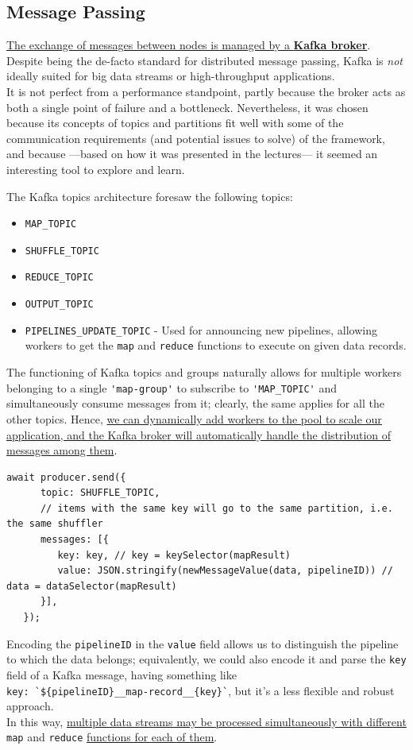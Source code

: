 \subsection{Message Passing}
\ul{The exchange of messages between nodes is managed by a \textbf{Kafka broker}}. 
Despite being the de-facto standard for distributed message passing, Kafka is \textit{not} ideally suited for big data streams or high-throughput applications.\\
It is not perfect from a performance standpoint, partly because the broker acts as both a single point of failure and a bottleneck. Nevertheless, it was chosen because its concepts of topics and partitions fit well with some of the communication requirements (and potential issues to solve) of the framework, and because ---based on how it was presented in the lectures--- it seemed an interesting tool to explore and learn.

{The Kafka topics architecture foresaw the following topics:\ns
\begin{itemize}
   \label{enum:simplerTopics}
   \item \verb|MAP_TOPIC|
   \item \verb|SHUFFLE_TOPIC|
   \item \verb|REDUCE_TOPIC|
   \item \verb|OUTPUT_TOPIC|
   \item \verb|PIPELINES_UPDATE_TOPIC| - Used for announcing new pipelines, allowing workers to get the \verb|map| and \verb|reduce| functions to execute on given data records.
\end{itemize}}

The functioning of Kafka topics and groups naturally allows for multiple workers belonging to a single \verb|'map-group'| to subscribe to \verb|'MAP_TOPIC'| and simultaneously consume messages from it; clearly, the same applies for all the other topics. 
Hence, \ul{we can dynamically add workers to the pool to scale our application, and the Kafka broker will automatically handle the distribution of messages among them}.

\begin{lstlisting}[caption={Sending MAP record to shuffle topic},label={lst:sendingMapRecord}]
   await producer.send({
      topic: SHUFFLE_TOPIC,
      // items with the same key will go to the same partition, i.e. the same shuffler
      messages: [{ 
         key: key, // key = keySelector(mapResult)
         value: JSON.stringify(newMessageValue(data, pipelineID)) // data = dataSelector(mapResult)
      }],
   });
\end{lstlisting}
Encoding the \verb|pipelineID| in the \verb|value| field allows us to distinguish the pipeline to which the data belongs; equivalently, we could also encode it and parse the \verb|key| field of a Kafka message, having something like \\ \verb|key: `${pipelineID}__map-record__{key}`|, but it's a less flexible and robust approach.\\
In this way, \ul{multiple data streams may be processed simultaneously with different} \verb|map| and \verb|reduce| \ul{functions for each of them}.

